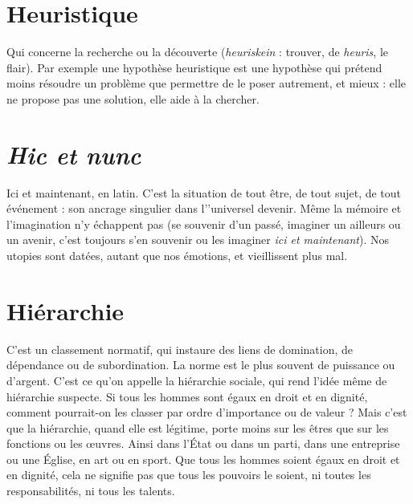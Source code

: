 \section{Heuristique}
Qui concerne la recherche ou la découverte ({\it heuriskein} :
trouver, de {\it heuris}, le flair). Par exemple une hypothèse
heuristique est une hypothèse qui prétend moins résoudre un problème que
permettre de le poser autrement, et mieux : elle ne propose pas une solution,
elle aide à la chercher.

\section{{\it Hic et nunc}}
Ici et maintenant, en latin. C’est la situation de tout être, de
tout sujet, de tout événement : son ancrage singulier dans
l’'universel devenir. Même la mémoire et l'imagination n’y échappent pas (se
souvenir d’un passé, imaginer un ailleurs ou un avenir, c’est toujours s’en souvenir
ou les imaginer {\it ici et maintenant}). Nos utopies sont datées, autant que
nos émotions, et vieillissent plus mal.

\section{Hiérarchie}
C’est un classement normatif, qui instaure des liens de
domination, de dépendance ou de subordination. La norme
est le plus souvent de puissance ou d’argent. C’est ce qu’on appelle la hiérarchie
sociale, qui rend l’idée même de hiérarchie suspecte. Si tous les hommes sont
égaux en droit et en dignité, comment pourrait-on les classer par ordre
d'importance ou de valeur ? Mais c’est que la hiérarchie, quand elle est légitime,
porte moins sur les êtres que sur les fonctions ou les œuvres. Ainsi dans
l'État ou dans un parti, dans une entreprise ou une Église, en art ou en sport.
Que tous les hommes soient égaux en droit et en dignité, cela ne signifie pas
que tous les pouvoirs le soient, ni toutes les responsabilités, ni tous les talents.

